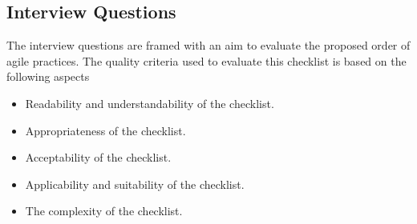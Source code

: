 \documentclass[a4paper,oneside]{bth}
\begin{document}
\subsection{Interview Questions}
The interview questions are framed with an aim to evaluate the proposed order of agile practices. The quality criteria used to evaluate this checklist is based on the following aspects
\begin{itemize}
\item	Readability and understandability of the checklist.
\item	Appropriateness of the checklist.
\item	Acceptability of the checklist.
\item	Applicability and suitability of the checklist.
\item	The complexity of the checklist.
\end{itemize}
\end{document}
